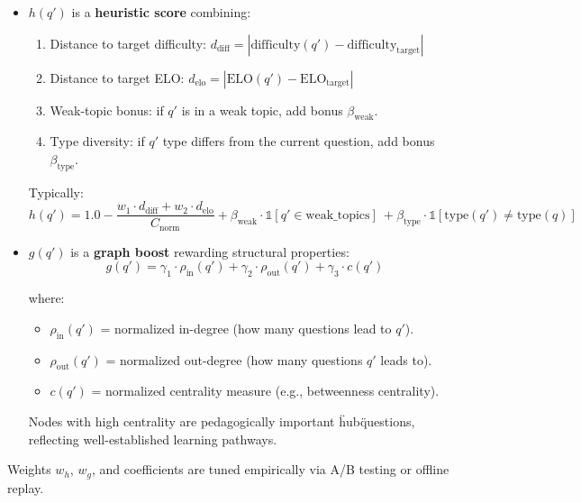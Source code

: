 \documentclass[sigconf,authordraft,twoside]{acmart}
\begin{document}
\begin{itemize}
\item $h(q')$ is a \textbf{heuristic score} combining:
   \begin{enumerate}
   \item Distance to target difficulty: $d_{\text{diff}} = |\text{difficulty}(q') - \text{difficulty}_{\text{target}}|$
   \item Distance to target ELO: $d_{\text{elo}} = |\text{ELO}(q') - \text{ELO}_{\text{target}}|$
   \item Weak-topic bonus: if $q'$ is in a weak topic, add bonus $\beta_{\text{weak}}$.
   \item Type diversity: if $q'$ type differs from the current question, add bonus $\beta_{\text{type}}$.
   \end{enumerate}
   
   Typically:
   \begin{equation}
   h(q') = 1.0 - \frac{w_1 \cdot d_{\text{diff}} + w_2 \cdot d_{\text{elo}}}{C_{\text{norm}}} + \beta_{\text{weak}} \cdot \mathbb{1}[q' \in \text{weak\_topics}] 
   \ 



   
   + \beta_{\text{type}} \cdot \mathbb{1}[\text{type}(q') \neq \text{type}(q)]
   \end{equation}

\item $g(q')$ is a \textbf{graph boost} rewarding structural properties:
   \begin{equation}
   g(q') = \gamma_1 \cdot \rho_{\text{in}}(q') + \gamma_2 \cdot \rho_{\text{out}}(q') + \gamma_3 \cdot c(q')
   \end{equation}
   
   where:
   \begin{itemize}
   \item $\rho_{\text{in}}(q')$ = normalized in-degree (how many questions lead to $q'$).
   \item $\rho_{\text{out}}(q')$ = normalized out-degree (how many questions $q'$ leads to).
   \item $c(q')$ = normalized centrality measure (e.g., betweenness centrality).
   \end{itemize}
   
   Nodes with high centrality are pedagogically important \"hub\" questions, reflecting well-established learning pathways.
\end{itemize}

Weights $w_h$, $w_g$, and coefficients are tuned empirically via A/B testing or offline replay.
\end{document}
